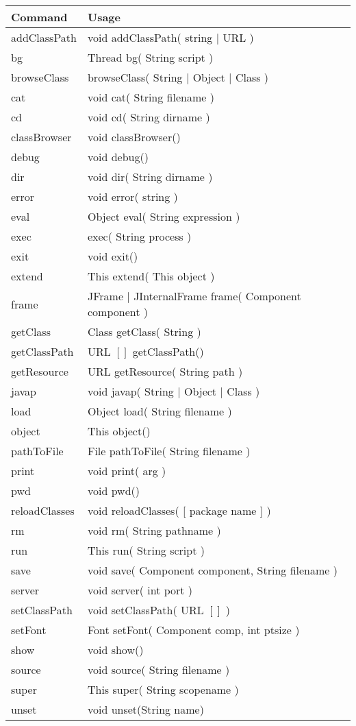 \documentclass[twoside,11pt]{article}
\renewcommand{\_}{\texttt{\symbol{95}}}
\begin{document}
\begin{tabular}{|l|l|}
\hline
Command       & Usage \\
\hline
addClassPath  & void addClassPath( string $|$ URL )\\
bg            & Thread bg( String script )\\
browseClass   & browseClass( String $|$ Object $|$ Class )\\
cat           & void cat( String filename )\\
cd            & void cd( String dirname )\\
classBrowser  & void classBrowser()\\
debug         & void debug()\\
dir           & void dir( String dirname )\\
error         & void error( string )\\
eval          & Object eval( String expression )\\
exec          & exec( String process )\\
exit          & void exit()\\
extend        & This extend( This object )\\
frame         & JFrame $|$ JInternalFrame frame( Component component )\\
getClass      & Class getClass( String )\\
getClassPath  & URL $[]$ getClassPath()\\
getResource   & URL getResource( String path )\\
javap         & void javap( String $|$ Object $|$ Class )\\
load          & Object load( String filename )\\
object        & This object()\\
pathToFile    & File pathToFile( String filename )\\
print         & void print( arg )\\
pwd           & void pwd()\\
reloadClasses & void reloadClasses( [ package name ] )\\
rm            & void rm( String pathname )\\
run           & This run( String script )\\
save          & void save( Component component, String filename )\\
server        & void server( int port )\\
setClassPath  & void setClassPath( URL $[]$ )\\
setFont       & Font setFont( Component comp, int ptsize )\\
show          & void show()\\
source        & void source( String filename )\\
super         & This super( String scopename )\\
unset         & void unset(String name)\\
\hline
\end{tabular}
\end{document}
